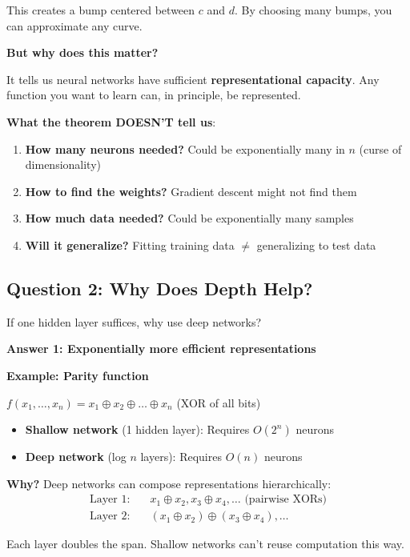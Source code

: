 \documentclass[11pt,oneside]{book}
\begin{document}
This creates a bump centered between $c$ and $d$. By choosing many bumps, you can approximate any curve.

\textbf{But why does this matter?}

It tells us neural networks have sufficient \textbf{representational capacity}. Any function you want to learn can, in principle, be represented.

\textbf{What the theorem DOESN'T tell us}:

\begin{enumerate}
\item \textbf{How many neurons needed?} Could be exponentially many in $n$ (curse of dimensionality)
\item \textbf{How to find the weights?} Gradient descent might not find them
\item \textbf{How much data needed?} Could be exponentially many samples
\item \textbf{Will it generalize?} Fitting training data $\neq$ generalizing to test data
\end{enumerate}

\subsection{Question 2: Why Does Depth Help?}

If one hidden layer suffices, why use deep networks?

\textbf{Answer 1: Exponentially more efficient representations}

\textbf{Example: Parity function}

$f(x_1, \ldots, x_n) = x_1 \oplus x_2 \oplus \ldots \oplus x_n$ (XOR of all bits)

\begin{itemize}
\item \textbf{Shallow network} (1 hidden layer): Requires $O(2^n)$ neurons
\item \textbf{Deep network} (log $n$ layers): Requires $O(n)$ neurons
\end{itemize}

\textbf{Why?} Deep networks can compose representations hierarchically:
\begin{align*}
\text{Layer 1:} \quad & x_1 \oplus x_2, x_3 \oplus x_4, \ldots  \text{ (pairwise XORs)} \\
\text{Layer 2:} \quad & (x_1 \oplus x_2) \oplus (x_3 \oplus x_4), \ldots
\end{align*}

Each layer doubles the span. Shallow networks can't reuse computation this way.
\end{document}
